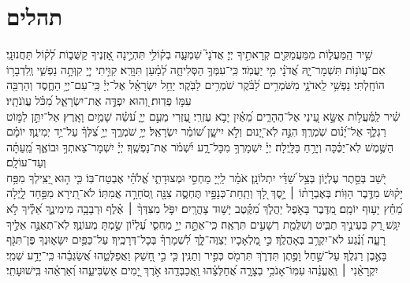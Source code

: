 \documentclass[a4paper, twoside, openany, parskip=half, 11pt]{article}
\begin{document}
\section*{תהלים}
\begin{multicols}{2}
שִׁ֥יר הַֽמַּעֲל֑וֹת מִמַּעֲמַקִּ֖ים קְרָאתִ֣יךָ יְיָ׃ 
 אֲדֹנָי֮ שִׁמְעָ֪ה בְק֫וֹלִ֥י תִּהְיֶ֣ינָה אָ֭זְנֶיךָ קַשֻּׁב֑וֹת לְ֝ק֗וֹל תַּחֲנוּנָֽי׃ 
 אִם־עֲוֺנ֥וֹת תִּשְׁמָר־יָ֑הּ אֲ֝דֹנָ֗י מִ֣י יַעֲמֹֽד׃ 
 כִּֽי־עִמְּךָ֥ הַסְּלִיחָ֑ה לְ֝מַ֗עַן תִּוָּרֵֽא׃ 
 קִוִּ֣יתִי יְיָ֭ קִוְּתָ֣ה נַפְשִׁ֑י וְֽלִדְבָר֥וֹ הוֹחָֽלְתִּי׃ 
 נַפְשִׁ֥י לַֽאדֹנָ֑י מִשֹּׁמְרִ֥ים לַ֝בֹּ֗קֶר שֹׁמְרִ֥ים לַבֹּֽקֶר׃ 
 יַחֵ֥ל יִשְׂרָאֵ֗ל אֶל־יְיָ֫ כִּֽי־עִם־יְיָ֥ הַחֶ֑סֶד וְהַרְבֵּ֖ה עִמּ֣וֹ פְדֽוּת׃ 
 וְ֭הוּא יִפְדֶּ֣ה אֶת־יִשְׂרָאֵ֑ל מִ֝כֹּ֗ל עֲוֺנֹתָֽיו׃ \\
 
שִׁ֗יר לַֽמַּ֫עֲל֥וֹת אֶשָּׂ֣א עֵ֭ינַי אֶל־הֶהָרִ֑ים מֵ֝אַ֗יִן יָבֹ֥א עֶזְרִֽי׃ 
 עֶ֭זְרִי מֵעִ֣ם יְיָ֑ עֹ֝שֵׂ֗ה שָׁמַ֥יִם וָאָֽרֶץ׃ 
 אַל־יִתֵּ֣ן לַמּ֣וֹט רַגְלֶ֑ךָ אַל־יָ֝נ֗וּם שֹֽׁמְרֶֽךָ׃ 
 הִנֵּ֣ה לֹֽא־יָ֭נוּם וְלֹ֣א יִישָׁ֑ן שׁ֝וֹמֵ֗ר יִשְׂרָאֵֽל׃ 
 יְיָ֥ שֹׁמְרֶ֑ךָ יְיָ֥ צִ֝לְּךָ֗ עַל־יַ֥ד יְמִינֶֽךָ׃ 
 יוֹמָ֗ם הַשֶּׁ֥מֶשׁ לֹֽא־יַכֶּ֗כָּה וְיָרֵ֥חַ בַּלָּֽיְלָה׃ 
 יְיָ֗ יִשְׁמָרְךָ֥ מִכָּל־רָ֑ע יִ֝שְׁמֹ֗ר אֶת־נַפְשֶֽׁךָ׃ 
 יְיָ֗ יִשְׁמָר־צֵאתְךָ֥ וּבוֹאֶ֑ךָ מֵֽ֝עַתָּ֗ה וְעַד־עוֹלָֽם׃ \\
 
יֹ֭שֵׁב בְּסֵ֣תֶר עֶלְי֑וֹן בְּצֵ֥ל שַׁ֝דַּ֗י יִתְלוֹנָֽן׃ 
 אֹמַ֗ר לַֽייָ֭ מַחְסִ֣י וּמְצוּדָתִ֑י אֱ֝לֹהַ֗י אֶבְטַח־בּֽוֹ׃ 
 כִּ֤י ה֣וּא יַ֭צִּֽילְךָ מִפַּ֥ח יָק֗וּשׁ מִדֶּ֥בֶר הַוּֽוֹת׃ 
 בְּאֶבְרָת֨וֹ ׀ יָ֣סֶךְ לָ֭ךְ וְתַֽחַת־כְּנָפָ֣יו תֶּחְסֶ֑ה צִנָּ֖ה וְֽסֹחֵרָ֣ה אֲמִתּֽוֹ׃ 
 לֹא־תִ֭ירָא מִפַּ֣חַד לָ֑יְלָה מֵ֝חֵ֗ץ יָע֥וּף יוֹמָֽם׃ 
 מִ֭דֶּבֶר בָּאֹ֣פֶל יַהֲלֹ֑ךְ מִ֝קֶּ֗טֶב יָשׁ֥וּד צָהֳרָֽיִם׃ 
 יִפֹּ֤ל מִצִּדְּךָ֨ ׀ אֶ֗לֶף וּרְבָבָ֥ה מִימִינֶ֑ךָ אֵ֝לֶ֗יךָ לֹ֣א יִגָּֽשׁ׃ 
 רַ֭ק בְּעֵינֶ֣יךָ תַבִּ֑יט וְשִׁלֻּמַ֖ת רְשָׁעִ֣ים תִּרְאֶֽה׃ 
 כִּֽי־אַתָּ֣ה יְיָ֣ מַחְסִ֑י עֶ֝לְי֗וֹן שַׂ֣מְתָּ מְעוֹנֶֽךָ׃ 
 לֹֽא־תְאֻנֶּ֣ה אֵלֶ֣יךָ רָעָ֑ה וְ֝נֶ֗גַע לֹא־יִקְרַ֥ב בְּאָהֳלֶֽךָ׃ 
 כִּ֣י מַ֭לְאָכָיו יְצַוֶּה־לָּ֑ךְ לִ֝שְׁמָרְךָ֗ בְּכָל־דְּרָכֶֽיךָ׃ 
 עַל־כַּפַּ֥יִם יִשָּׂא֑וּנְךָ פֶּן־תִּגֹּ֖ף בָּאֶ֣בֶן רַגְלֶֽךָ׃ 
 עַל־שַׁ֣חַל וָפֶ֣תֶן תִּדְרֹ֑ךְ תִּרְמֹ֖ס כְּפִ֣יר וְתַנִּֽין׃ 
 כִּ֤י בִ֣י חָ֭שַׁק וַאֲפַלְּטֵ֑הוּ אֲ֝שַׂגְּבֵ֗הוּ כִּֽי־יָדַ֥ע שְׁמִֽי׃ 
 יִקְרָאֵ֨נִי ׀ וְֽאֶעֱנֵ֗הוּ עִמּֽוֹ־אָנֹכִ֥י בְצָרָ֑ה אֲ֝חַלְּצֵ֗הוּ וַֽאֲכַבְּדֵֽהוּ׃ 
 אֹ֣רֶךְ יָ֭מִים אַשְׂבִּיעֵ֑הוּ וְ֝אַרְאֵ֗הוּ בִּֽישׁוּעָתִֽי׃ \\
 

\end{multicols}
\end{document}

